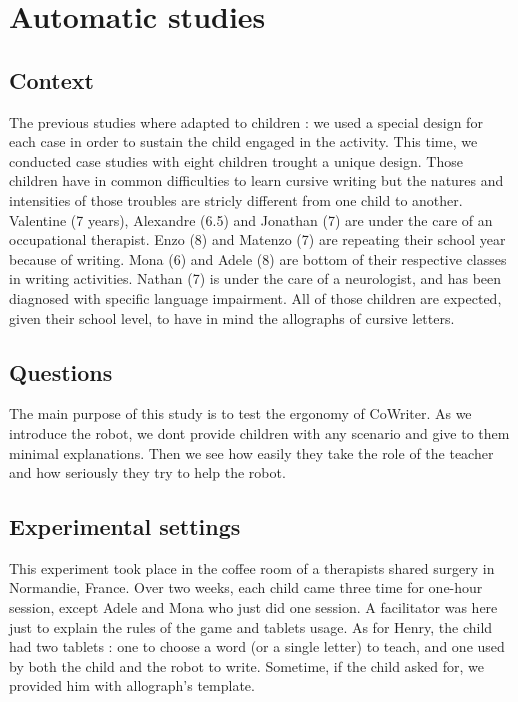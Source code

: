 \documentclass{sig-alternate}
\begin{document}
\section{Automatic studies}

\subsection{Context}

The previous studies where adapted to children : we used a special
design for each case in order to sustain the child engaged in the activity.
This time, we conducted case studies with eight children trought a unique
design. Those children have in common difficulties to learn
cursive writing but the natures and intensities of those troubles are stricly
different from one child to another. Valentine (7 years), Alexandre (6.5) and
Jonathan (7) are under the care of an
occupational therapist. Enzo (8) and Matenzo (7) are repeating their school year
because of writing. Mona (6) and Adele (8) are bottom of their respective
classes in writing activities. Nathan (7) is under the care of a neurologist, and
has been diagnosed with specific language impairment. All of those children are
expected, given their school level, to have in mind the allographs of
cursive letters. 

\subsection{Questions}

The main purpose of this study is to test the ergonomy of CoWriter. As we
introduce the robot, we dont
provide children with any scenario and give to them minimal explanations. Then
we see how easily they take the role of the teacher and how seriously they try to help the robot.

\subsection{Experimental settings}

This experiment took place in the coffee room of a therapists shared surgery
in Normandie, France. Over two weeks, each child came three time for one-hour
session, except Adele and Mona who just did one session. A facilitator was here
just to explain the rules of the game and tablets usage. As for Henry, the child
had two tablets : one to choose a word (or a single letter) to teach, and one
used by both the child and the robot to write. Sometime, if the child asked for,
we provided him with allograph's template. 
\end{document}
